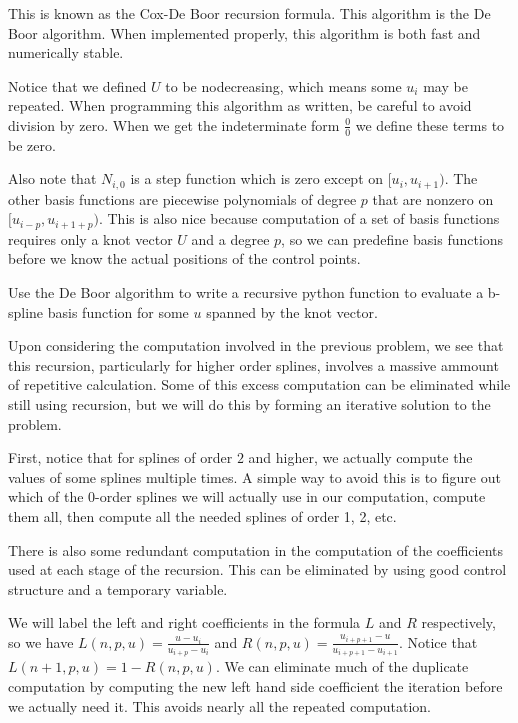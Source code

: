 This is known as the Cox-De Boor recursion formula.
This algorithm is the De Boor algorithm. 
When implemented properly, this algorithm is both fast and numerically stable.

Notice that we defined $U$ to be nodecreasing, which means some $u_i$ may be repeated.
When programming this algorithm as written, be careful to avoid division by zero.
When we get the indeterminate form $\frac{0}{0}$ we define these terms to be zero.

Also note that $N_{i,0}$ is a step function which is zero except on $[u_i, u_{i+1})$. 
The other basis functions are piecewise polynomials of degree $p$ that are nonzero on $[u_{i-p}, u_{i+1+p})$.
This is also nice because computation of a set of basis functions requires only a knot vector $U$ and a degree $p$, so we can predefine basis functions before we know the actual positions of the control points.

\begin{problem}
Use the De Boor algorithm to write a recursive python function to evaluate a b-spline basis function for some $u$ spanned by the knot vector.
\end{problem}

Upon considering the computation involved in the previous problem, we see that this recursion, particularly for higher order splines, involves a massive ammount of repetitive calculation.
Some of this excess computation can be eliminated while still using recursion, but we will do this by forming an iterative solution to the problem.

First, notice that for splines of order $2$ and higher, we actually compute the values of some splines multiple times.
A simple way to avoid this is to figure out which of the 0-order splines we will actually use in our computation, compute them all, then compute all the needed splines of order 1, 2, etc.

There is also some redundant computation in the computation of the coefficients used at each stage of the recursion.
This can be eliminated by using good control structure and a temporary variable.

We will label the left and right coefficients in the formula $L$ and $R$ respectively, so we have $L(n,p,u) = \frac{u - u_i}{u_{i+p} - u_i}$ and $R(n,p,u) = \frac{u_{i + p + 1} - u}{u_{i + p + 1} - u_{i + 1}}$. Notice that $L(n+1,p,u) = 1 - R(n,p,u)$. We can eliminate much of the duplicate computation by computing the new left hand side coefficient the iteration before we actually need it. This avoids nearly all the repeated computation.

